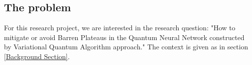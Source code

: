 \subsection{The problem} 
\label{Problem Section}
For this research project, we are interested in the research question: "How to mitigate or avoid Barren Plateaus in the Quantum Neural Network constructed by Variational Quantum Algorithm approach." 
The context is given as in section \ref{Background Section}.